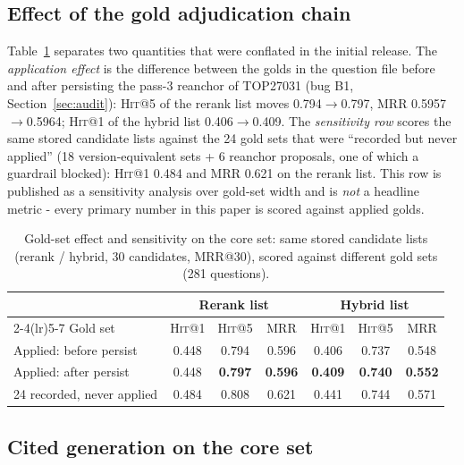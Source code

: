 \documentclass[10pt,a4paper,twocolumn]{article}
\newcommand{\hit}{\textsc{Hit}}
\begin{document}
\subsection{Effect of the gold adjudication chain}

Table~\ref{tab:gold-effect} separates two quantities that were conflated in the initial release. The \emph{application effect} is the difference between the golds in the question file before and after persisting the pass-3 reanchor of TOP27031 (bug B1, Section~\ref{sec:audit}): \hit{}@5 of the rerank list moves 0.794$\rightarrow$0.797, MRR 0.5957$\rightarrow$0.5964; \hit{}@1 of the hybrid list 0.406$\rightarrow$0.409. The \emph{sensitivity row} scores the same stored candidate lists against the 24 gold sets that were ``recorded but never applied'' (18 version-equivalent sets + 6 reanchor proposals, one of which a guardrail blocked): \hit{}@1 0.484 and MRR 0.621 on the rerank list. This row is published as a sensitivity analysis over gold-set width and is \emph{not} a headline metric - every primary number in this paper is scored against applied golds.

\begin{table}[t]
\centering\scriptsize
\caption{Gold-set effect and sensitivity on the core set: same stored candidate lists (rerank / hybrid, 30 candidates, MRR@30), scored against different gold sets (281 questions).}
\label{tab:gold-effect}
\setlength{\tabcolsep}{2.4pt}
\begin{tabular}{lcccccc}
\toprule
 & \multicolumn{3}{c}{Rerank list} & \multicolumn{3}{c}{Hybrid list} \\
\cmidrule(lr){2-4}\cmidrule(lr){5-7}
Gold set & \hit{}@1 & \hit{}@5 & MRR & \hit{}@1 & \hit{}@5 & MRR \\
\midrule
Applied: before persist & 0.448 & 0.794 & 0.596 & 0.406 & 0.737 & 0.548 \\
Applied: after persist & 0.448 & \textbf{0.797} & \textbf{0.596} & \textbf{0.409} & \textbf{0.740} & \textbf{0.552} \\
\midrule
24 recorded, never applied & 0.484 & 0.808 & 0.621 & 0.441 & 0.744 & 0.571 \\
\bottomrule
\end{tabular}
\end{table}

\subsection{Cited generation on the core set}
\end{document}
